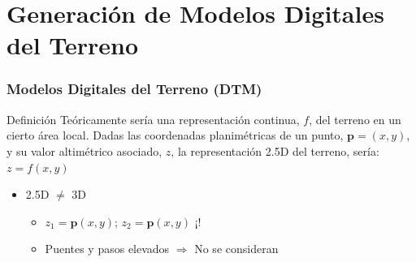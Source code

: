 \section[DTM]{Generación de Modelos Digitales del Terreno}
\begin{frame}
  \frametitle{Modelos Digitales del Terreno (DTM)}
  \begin{beamerboxesrounded}[shadow=true]{Definición}
    Teóricamente sería una representación continua, $f$, del terreno en un
    cierto área local. Dadas las coordenadas planimétricas de un punto,
    $\mathbf{p}=(x,y)$, y su valor altimétrico asociado, $z$, la representación
    \alert<1>{2.5D} del terreno, sería: $z=f(x,y)$
  \end{beamerboxesrounded}
  \begin{itemize}
    \item<2-> \alert<2>{2.5D $\ne$ 3D}
      \begin{itemize}
        \item<3-> $z_1 = \mathbf{p}(x,y)$; $z_2 = \mathbf{p}(x,y)$ \alert<3>{¡!}
        \item<4-> Puentes y pasos elevados $\Rightarrow$ \alert<4>{No se consideran}
      \end{itemize}
  \end{itemize}
\end{frame}
